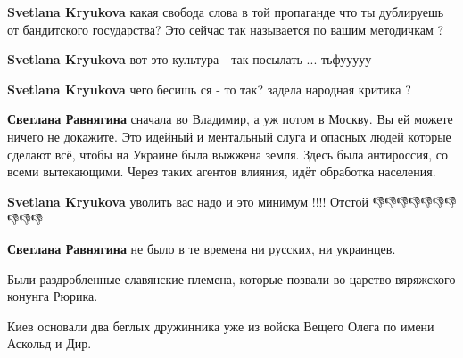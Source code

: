 \begin{itemize}
\begin{itemize}
\textbf{Svetlana Kryukova} какая свобода слова в той пропаганде что ты дублируешь от бандитского государства? Это сейчас так называется по вашим методичкам ?

 
\textbf{Svetlana Kryukova} вот это культура - так посылать ... тьфууууу

 
\textbf{Svetlana Kryukova} чего бесишь ся - то так? задела народная критика ?

 
\textbf{Светлана Равнягина} сначала во Владимир, а уж потом в Москву. Вы ей можете ничего не докажите. Это идейный и ментальный слуга и опасных людей которые сделают всё, чтобы на Украине была выжжена земля. Здесь была антироссия, со всеми вытекающими. Через таких агентов влияния, идёт обработка населения.

 
\textbf{Svetlana Kryukova} уволить вас надо и это минимум !!!! Отстой 👎👎👎👎👎👎👎👎👎👎

 
\textbf{Светлана Равнягина} не было в те времена ни русских, ни украинцев.

Были раздробленные славянские племена, которые позвали во царство вяряжского конунга Рюрика.

Киев основали два беглых дружинника уже из войска Вещего Олега по имени Аскольд и Дир.


\end{itemize}
\end{itemize}
